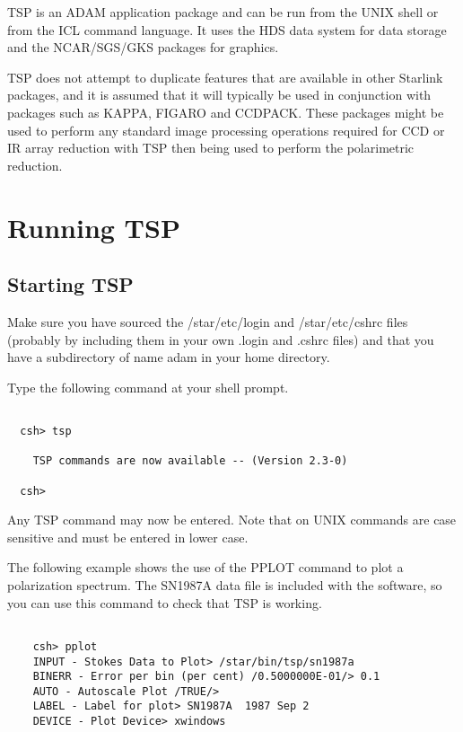 TSP is an ADAM application package and can be run from the UNIX shell or
from the ICL command language.
It uses the HDS data system for data storage and the NCAR/SGS/GKS packages
for graphics.

TSP does not attempt to duplicate features that are available in other Starlink
packages, and it is assumed that it will typically be used in conjunction with packages such as KAPPA, FIGARO and CCDPACK. These packages might be used to perform any standard image processing operations required for CCD or IR array
reduction with TSP then being used to perform the polarimetric reduction.

\section{Running TSP}

\subsection{Starting TSP}

Make sure you have sourced the /star/etc/login and /star/etc/cshrc files (probably by including them in your own .login and .cshrc files) and that you have a subdirectory of name adam in your home directory.

Type the following command at your shell prompt.

\begin{verbatim}

  csh> tsp

    TSP commands are now available -- (Version 2.3-0)

  csh>
\end{verbatim}

Any TSP command may now be entered. Note that on UNIX commands are case sensitive and must be entered in lower case.

The following example shows the use of the
PPLOT command to plot a polarization spectrum. The SN1987A data file is
included with the software, so you can use this command to check that TSP
is working.

\begin{verbatim}

    csh> pplot
    INPUT - Stokes Data to Plot> /star/bin/tsp/sn1987a
    BINERR - Error per bin (per cent) /0.5000000E-01/> 0.1
    AUTO - Autoscale Plot /TRUE/>
    LABEL - Label for plot> SN1987A  1987 Sep 2
    DEVICE - Plot Device> xwindows

\end{verbatim}



